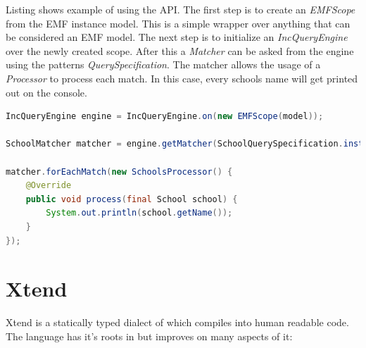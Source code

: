 Listing  shows example of using the \EIQ{} API. The first
step is to create an \emph{EMFScope} from the EMF instance model. This is a
simple wrapper over anything that can be considered an EMF model. The next step
is to initialize an \emph{IncQueryEngine} over the newly created scope. After
this a \emph{Matcher} can be asked from the engine using the patterns
\emph{QuerySpecification}. The matcher allows the usage of a \emph{Processor} to
process each match. In this case, every schools name will get printed out on the
console.

\begin{lstlisting}[frame=single, language=Java,
label=listing:EIQApiUsage, caption=Usage of the \EIQ{} API] 
IncQueryEngine engine = IncQueryEngine.on(new EMFScope(model));

SchoolMatcher matcher = engine.getMatcher(SchoolQuerySpecification.instance);

matcher.forEachMatch(new SchoolsProcessor() {
	@Override
	public void process(final School school) {
		System.out.println(school.getName());
	}
});
\end{lstlisting}

\section{Xtend}\label{sec:Xtend}

Xtend is a statically typed dialect of \Java{} which compiles into human
readable \Java{} code. The language has it's roots in \Java{} but improves on
many aspects of it:

